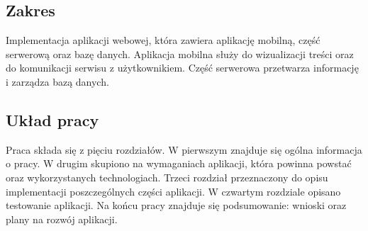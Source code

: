 \subsection{Zakres}
Implementacja aplikacji webowej, która zawiera aplikację mobilną, część serwerową oraz bazę danych.
Aplikacja mobilna służy do wizualizacji treści oraz do komunikacji serwisu z użytkownikiem.
Część serwerowa przetwarza informację i zarządza bazą danych.

\subsection{Układ pracy}
Praca składa się z pięciu rozdziałów. W pierwszym znajduje się ogólna informacja o pracy.
W drugim skupiono na wymaganiach aplikacji, która powinna powstać oraz wykorzystanych technologiach.
Trzeci rozdział przeznaczony do opisu implementacji poszczególnych części aplikacji.
W czwartym rozdziale opisano testowanie aplikacji.
Na końcu pracy znajduje się podsumowanie: wnioski oraz plany na rozwój aplikacji.